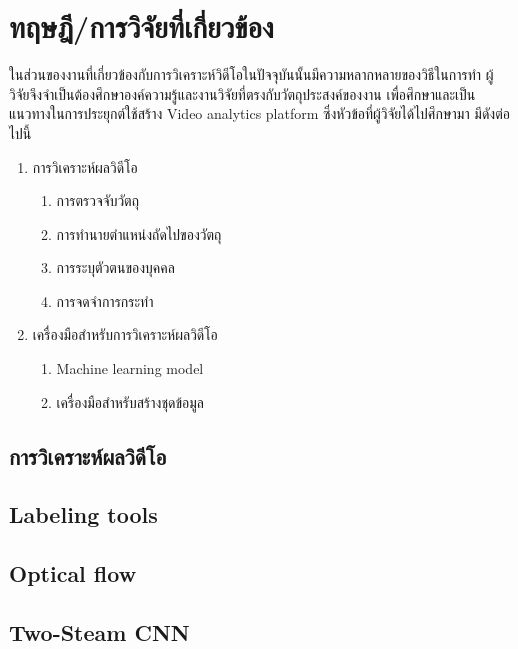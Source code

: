 \clearpage
\chapter{ทฤษฎี/การวิจัยที่เกี่ยวข้อง}
ในส่วนของงานที่เกี่ยวข้องกับการวิเคราะห์วิดีโอในปัจจุบันนั้นมีความหลากหลายของวิธีในการทำ ผู้วิจัยจึงจำเป็นต้องศึกษาองค์ความรู้และงานวิจัยที่ตรงกับวัตถุประสงค์ของงาน เพื่อศึกษาและเป็นแนวทางในการประยุกต์ใช้สร้าง Video analytics platform ซึ่งหัวข้อที่ผู้วิจัยได้ไปศึกษามา มีดังต่อไปนี้
\begin{enumerate}
	\setlength\itemsep{-0.25em}
	\item การวิเคราะห์ผลวิดีโอ
	\begin{enumerate}	
		\item การตรวจจับวัตถุ
		\item การทำนายตำแหน่งถัดไปของวัตถุ
		\item การระบุตัวตนของบุคคล
		\item การจดจำการกระทำ
	\end{enumerate}
	\setlength\itemsep{-0.25em}
	\item เครื่องมือสำหรับการวิเคราะห์ผลวิดีโอ
	\begin{enumerate}	
		\item Machine learning model
		\item เครื่องมือสำหรับสร้างชุดข้อมูล
	\end{enumerate}
\end{enumerate}

\section{การวิเคราะห์ผลวิดีโอ}


\clearpage
\section{Labeling tools}


\clearpage
%
%
%

\section{Optical flow}


\clearpage
\section{Two-Steam CNN}





